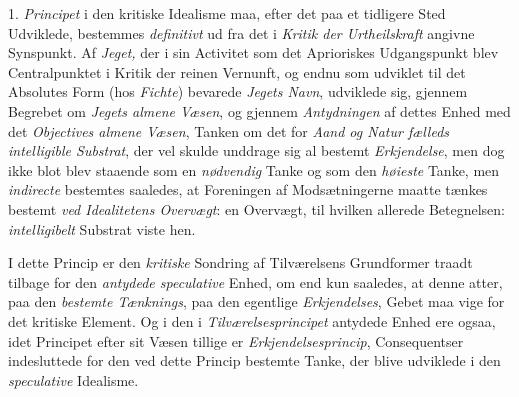 1. \emph{Principet} i den kritiske Idealisme maa, efter det
paa et tidligere Sted Udviklede, bestemmes \emph{definitivt} ud
fra det i \emph{Kritik der Urtheilskraft} angivne Synspunkt. Af
\emph{Jeget,} der i sin Activitet som det Aprioriskes Udgangspunkt
blev Centralpunktet i Kritik der reinen Vernunft, og endnu
som udviklet til det Absolutes Form (hos \emph{Fichte}) bevarede
\emph{Jegets Navn}, udviklede sig, gjennem Begrebet om \emph{Jegets
almene Væsen}, og gjennem \emph{Antydningen} af dettes Enhed
med det \emph{Objectives almene Væsen}, Tanken om det for
\emph{Aand og Natur fælleds intelligible Substrat}, der vel
skulde unddrage sig al bestemt \emph{Erkjendelse}, men dog ikke
blot blev staaende som en \emph{nødvendig} Tanke og som den
\emph{høieste} Tanke, men \emph{indirecte} bestemtes saaledes, at Foreningen
af Modsætningerne maatte tænkes bestemt \emph{ved Idealitetens
Overvægt}: en Overvægt, til hvilken allerede Betegnelsen:
\emph{intelligibelt} Substrat viste hen.

I dette Princip er den \emph{kritiske} Sondring af Tilværelsens
Grundformer traadt tilbage for den \emph{antydede speculative}
Enhed, om end kun saaledes, at denne atter, paa den \emph{bestemte
Tænknings}, paa den egentlige \emph{Erkjendelses}, Gebet maa vige
for det kritiske Element. Og i den i \emph{Tilværelsesprincipet}
antydede Enhed ere ogsaa, idet Principet efter sit Væsen tillige
er \emph{Erkjendelsesprincip}, Consequentser indesluttede for den
ved dette Princip bestemte Tanke, der blive udviklede i den
\emph{speculative} Idealisme.


